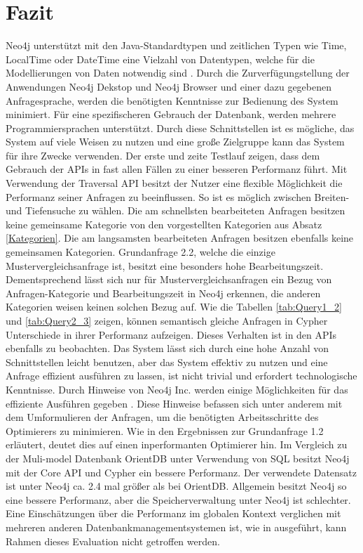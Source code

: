 \section{Fazit}
Neo4j unterstützt mit den Java-Standardtypen und  zeitlichen Typen wie Time, LocalTime oder DateTime eine Vielzahl von Datentypen, welche für die Modellierungen von Daten notwendig sind \parencite{Types}. Durch die Zurverfügungstellung der Anwendungen Neo4j Dekstop und Neo4j Browser und einer dazu gegebenen Anfragesprache, werden die benötigten Kenntnisse zur Bedienung des System minimiert. Für eine spezifischeren Gebrauch der Datenbank, werden mehrere Programmiersprachen unterstützt. Durch diese Schnittstellen ist es mögliche, das System auf viele Weisen zu nutzen und eine große Zielgruppe kann das System für ihre Zwecke verwenden. \newline 
Der erste und zeite Testlauf zeigen, dass dem Gebrauch der APIs in fast allen Fällen zu einer besseren Performanz führt. Mit Verwendung der Traversal API besitzt der Nutzer eine flexible Möglichkeit die Performanz seiner Anfragen zu beeinflussen. So ist es möglich zwischen Breiten- und Tiefensuche zu wählen. Die am schnellsten bearbeiteten Anfragen besitzen keine gemeinsame Kategorie von den vorgestellten Kategorien aus Absatz \ref{Kategorien}. Die am langsamsten bearbeiteten Anfragen besitzen ebenfalls keine gemeinsamen Kategorien. Grundanfrage 2.2, welche die einzige Mustervergleichsanfrage ist, besitzt eine besonders hohe Bearbeitungszeit. Dementsprechend lässt sich nur für Mustervergleichsanfragen ein Bezug von Anfragen-Kategorie und Bearbeitungszeit in Neo4j erkennen, die anderen Kategorien weisen keinen solchen Bezug auf. \newline
Wie die Tabellen \ref{tab:Query1_2} und \ref{tab:Query2_3} zeigen, können semantisch gleiche Anfragen in Cypher Unterschiede in ihrer Performanz aufzeigen. Dieses Verhalten ist in den APIs ebenfalls zu beobachten. Das System lässt sich durch eine hohe Anzahl von Schnittstellen leicht benutzen, aber das System effektiv zu nutzen und eine Anfrage effizient ausführen zu lassen, ist nicht trivial und erfordert technologische Kenntnisse. Durch Hinweise von Neo4j Inc. werden einige Möglichkeiten für das effiziente Ausführen gegeben \parencite{Optimizer}. Diese Hinweise befassen sich unter anderem mit dem Umformulieren der Anfragen, um die benötigten Arbeitsschritte des Optimierers zu minimieren. Wie in den Ergebnissen zur Grundanfrage 1.2 erläutert, deutet dies auf einen inperformanten Optimierer hin. \newline
Im Vergleich zu der Muli-model Datenbank OrientDB unter Verwendung von SQL besitzt Neo4j mit der Core API und Cypher ein bessere Performanz. Der verwendete Datensatz ist unter Neo4j ca. 2.4 mal größer als bei OrientDB. Allgemein besitzt Neo4j so eine bessere Performanz, aber die Speicherverwaltung unter Neo4j ist schlechter. Eine Einschätzungen über die Performanz im globalen Kontext verglichen mit mehreren anderen Datenbankmanagementsystemen ist, wie in \parencite{jouili2013empirical} ausgeführt, kann Rahmen dieses Evaluation nicht getroffen werden. 

